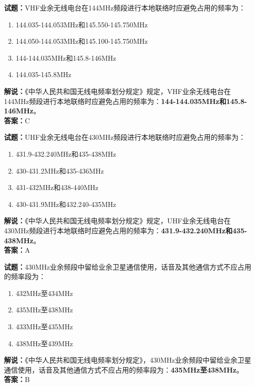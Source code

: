 \documentclass{ctexbook}
\begin{document}
\bigskip




\noindent\textbf{试题：}VHF业余无线电台在144\unit{\MHz}频段进行本地联络时应避免占用的频率为：
\begin{enumerate}[leftmargin=3em]
\item 144.035-144.053\unit{\MHz}和145.550-145.750\unit{\MHz}
\item 144.050-144.053\unit{\MHz}和145.100-145.750\unit{\MHz}
\item 144-144.035\unit{\MHz}和145.8-146\unit{\MHz}
\item 144.035-145.8\unit{\MHz}
\end{enumerate}
\noindent\textbf{解说：}《中华人民共和国无线电频率划分规定》规定，VHF业余无线电台在144\unit{\MHz}频段进行本地联络时应避免占用的频率为：\textbf{144-144.035\unit{\MHz}和145.8-146\unit{\MHz}}。\\\noindent\textbf{答案：}C

\bigskip




\noindent\textbf{试题：}UHF业余无线电台在430\unit{\MHz}频段进行本地联络时应避免占用的频率为：
\begin{enumerate}[leftmargin=3em]
\item 431.9-432.240\unit{\MHz}和435-438\unit{\MHz}
\item 430-431.2\unit{\MHz}和435-436\unit{\MHz}
\item 431-432\unit{\MHz}和438-440\unit{\MHz}
\item 430-431.9\unit{\MHz}和432.240-435\unit{\MHz}
\end{enumerate}
\noindent\textbf{解说：}《中华人民共和国无线电频率划分规定》规定，UHF业余无线电台在430\unit{\MHz}频段进行本地联络时应避免占用的频率为：\textbf{431.9-432.240\unit{\MHz}和435-438\unit{\MHz}}。\\\noindent\textbf{答案：}A

\bigskip




\noindent\textbf{试题：}430\unit{\MHz}业余频段中留给业余卫星通信使用，话音及其他通信方式不应占用的频率段为：
\begin{enumerate}[leftmargin=3em]
\item 432\unit{\MHz}至434\unit{\MHz}
\item 435\unit{\MHz}至438\unit{\MHz}
\item 433\unit{\MHz}至435\unit{\MHz}
\item 438\unit{\MHz}至439\unit{\MHz}
\end{enumerate}
\noindent\textbf{解说：}《中华人民共和国无线电频率划分规定》，430\unit{\MHz}业余频段中留给业余卫星通信使用，话音及其他通信方式不应占用的频率段为：\textbf{435\unit{\MHz}至438\unit{\MHz}}。\\\noindent\textbf{答案：}B
\end{document}
